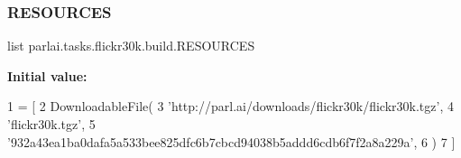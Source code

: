 \subsubsection{\texorpdfstring{R\+E\+S\+O\+U\+R\+C\+ES}{RESOURCES}}
{\footnotesize\ttfamily list parlai.\+tasks.\+flickr30k.\+build.\+R\+E\+S\+O\+U\+R\+C\+ES}

{\bfseries Initial value\+:}
\begin{DoxyCode}
1 =  [
2     DownloadableFile(
3         \textcolor{stringliteral}{'http://parl.ai/downloads/flickr30k/flickr30k.tgz'},
4         \textcolor{stringliteral}{'flickr30k.tgz'},
5         \textcolor{stringliteral}{'932a43ea1ba0dafa5a533bee825dfc6b7cbcd94038b5addd6cdb6f7f2a8a229a'},
6     )
7 ]
\end{DoxyCode}
